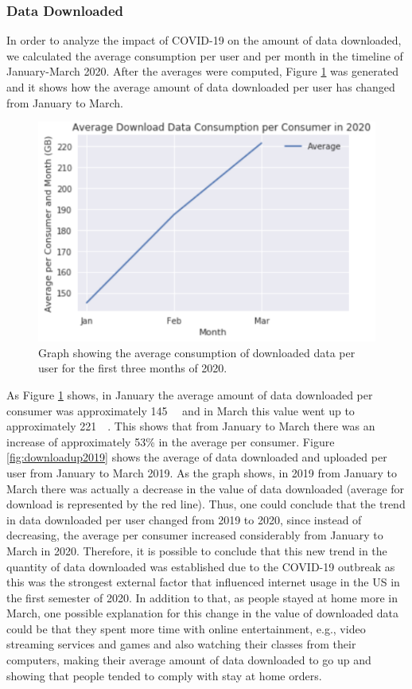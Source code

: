 \documentclass[conference,10pt]{IEEEtran}
\begin{document}
\subsubsection{Data Downloaded}
\label{sec:download-data-consumption}

In order to analyze the impact of COVID-19 on the amount of data downloaded, we calculated the average consumption per user and per month in the timeline of January-March 2020. After the averages were computed, Figure \ref{fig:download2020} was generated and it shows how the average amount of data downloaded per user has changed from January to March.

\begin{figure}
\centering
\includegraphics[width=1.0\linewidth]{figs/download2020.PNG}
\caption{Graph showing the average consumption of downloaded data per user for the first three months of 2020.}
\label{fig:download2020}
\end{figure}

As Figure \ref{fig:download2020} shows, in January the average amount of data downloaded per consumer was approximately \SI{145}{\giga\byte} and in March this value went up to approximately \SI{221}{\giga\byte}. This shows that from January to March there was an increase of approximately 53\% in the average per consumer. Figure \ref{fig:downloadup2019} shows the average of data downloaded and uploaded per user from January to March 2019. As the graph shows, in 2019 from January to March there was actually a decrease in the value of data downloaded (average for download is represented by the red line). Thus, one could conclude that the trend in data downloaded per user changed from 2019 to 2020, since instead of decreasing, the average per consumer increased considerably from January to March in 2020. Therefore, it is possible to conclude that this new trend in the quantity of data downloaded was established due to the COVID-19 outbreak as this was the strongest external factor that influenced internet usage in the US in the first semester of 2020. In addition to that, as people stayed at home more in March, one possible explanation for this change in the value of downloaded data could be that they spent more time with online entertainment, e.g., video streaming services and games and also watching their classes from their computers, making their average amount of data downloaded to go up and showing that people tended to comply with stay at home orders.
\end{document}

